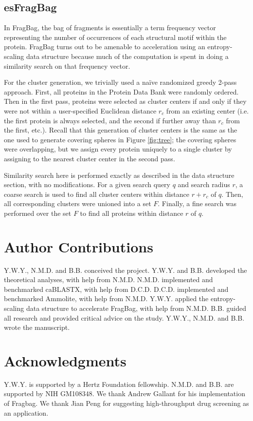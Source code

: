\documentclass[review,preprint,12pt]{elsarticle}
\theoremstyle{definition}
\theoremstyle{remark}
\numberwithin{equation}{section}
\begin{document}
\subsection{esFragBag}
In FragBag, the bag of fragments is essentially
a term frequency vector representing the number of occurrences of each structural motif within the protein.
FragBag turns out to be amenable to acceleration using an entropy-scaling data structure because much of the computation is spent in doing a similarity search on that frequency vector.

For the cluster generation, we trivially used a na\"ive randomized greedy 2-pass approach.
First, all proteins in the Protein Data Bank were randomly ordered.
Then in the first pass, proteins were selected as cluster centers if and only if they were not within a user-specified Euclidean distance $r_c$ from an existing center (i.e. the first protein is always selected, and the second if further away than $r_c$ from the first, etc.).
Recall that this generation of cluster centers is the same as the one used to generate covering spheres in Figure \ref{fig:tree};
the covering spheres were overlapping, but we assign every protein uniquely to a single cluster by assigning to the nearest cluster center in the second pass.

Similarity search here is performed exactly as described in the data structure section, with no modifications.
For a given search query $q$ and search radius $r$,
a coarse search is used to find all cluster centers within distance $r+r_c$ of $q$.
Then, all corresponding clusters were unioned into a set $F$.
Finally, a fine search was performed over the set $F$ to find all proteins within distance $r$ of $q$.

\section{Author Contributions}
Y.W.Y., N.M.D. and B.B. conceived the project.
Y.W.Y. and B.B. developed the theoretical analyses, with help from N.M.D.
N.M.D. implemented and benchmarked caBLASTX, with help from D.C.D.
D.C.D. implemented and benchmarked Ammolite, with help from N.M.D.
Y.W.Y. applied the entropy-scaling data structure to accelerate FragBag, with help from N.M.D.
B.B. guided all research and provided critical advice on the study.
Y.W.Y., N.M.D. and B.B. wrote the manuscript.

\section{Acknowledgments}
Y.W.Y. is supported by a Hertz Foundation fellowship.
N.M.D. and B.B. are supported by NIH GM108348.
We thank Andrew Gallant for his implementation of Fragbag.
We thank Jian Peng for suggesting high-throughput drug screening as an application.


%

\end{document}
